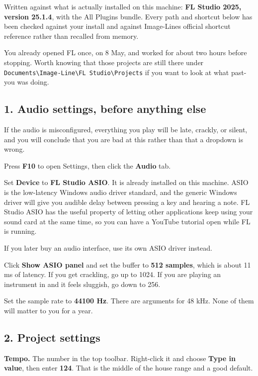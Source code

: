 Written against what is actually installed on this machine: \textbf{FL Studio 2025, version
25.1.4}, with the All Plugins bundle. Every path and shortcut below has been checked
against your install and against Image-Line\textquotesingle s official shortcut reference rather than
recalled from memory.

You already opened FL once, on 8 May, and worked for about two hours before stopping. Worth
knowing that those projects are still there under
\texttt{Documents\textbackslash{}Image-Line\textbackslash{}FL\ Studio\textbackslash{}Projects} if you want to look at what past-you was doing.

\subsection{1. Audio settings, before anything else}\label{fl00_setup-1-audio-settings-before-anything-else}

If the audio is misconfigured, everything you play will be late, crackly, or silent, and
you will conclude that you are bad at this rather than that a dropdown is wrong.

Press \textbf{F10} to open Settings, then click the \textbf{Audio} tab.

Set \textbf{Device} to \textbf{FL Studio ASIO}. It is already installed on this machine. ASIO is the
low-latency Windows audio driver standard, and the generic Windows driver will give you
audible delay between pressing a key and hearing a note. FL Studio ASIO has the useful
property of letting other applications keep using your sound card at the same time, so you
can have a YouTube tutorial open while FL is running.

If you later buy an audio interface, use its own ASIO driver instead.

Click \textbf{Show ASIO panel} and set the buffer to \textbf{512 samples}, which is about 11 ms of
latency. If you get crackling, go up to 1024. If you are playing an instrument in and it
feels sluggish, go down to 256.

Set the sample rate to \textbf{44100 Hz}. There are arguments for 48 kHz. None of them will
matter to you for a year.

\subsection{2. Project settings}\label{fl00_setup-2-project-settings}

\textbf{Tempo.} The number in the top toolbar. Right-click it and choose \textbf{Type in value}, then
enter \textbf{124}. That is the middle of the house range and a good default.

